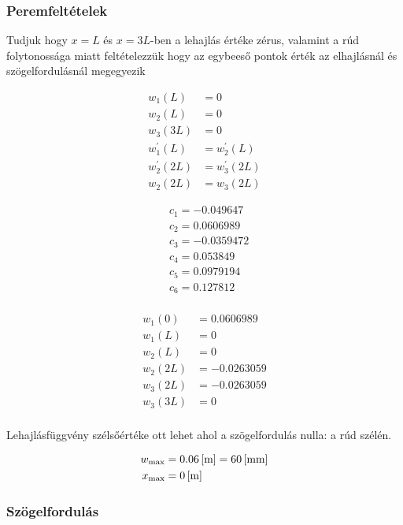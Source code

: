\newpage

\subsubsection{Peremfeltételek}

Tudjuk hogy $x = L$ és $x = 3L$-ben a lehajlás értéke zérus, valamint a rúd folytonossága miatt feltételezzük hogy az egybeeső pontok érték az elhajlásnál és szögelfordulásnál megegyezik

\begin{align*}
	w_1(L) &= 0 \\
	w_2(L) &= 0 \\
	w_3(3L) &= 0 \\
	w_1^{'}(L) &= w_2^{'}(L) \\
	w_2^{'}(2L) &= w_3^{'}(2L) \\
	w_2(2L) &= w_3(2L) 
\end{align*}

\begin{align*}
	&c_1 = -0.049647 \\
	&c_2 = 0.0606989 \\
	&c_3 = -0.0359472 \\
	&c_4 = 0.053849 \\
	&c_5 = 0.0979194 \\
	&c_6 = 0.127812 \\
\end{align*}

\begin{align*}
	w_1(0) &= 0.0606989 \\
	w_1(L) &= 0 \\
	w_2(L) &= 0 \\
	w_2(2L) &= -0.0263059 \\
	w_3(2L) &= -0.0263059 \\
	w_3(3L) &= 0 \\
\end{align*}

Lehajlásfüggvény szélsőértéke ott lehet ahol a szögelfordulás nulla: a rúd szélén.

\begin{align*}
	w_{\text{max}} &= \m{0.06} = \mm{60} \\
	x_{\text{max}} &= \m{0}
\end{align*}

\newpage

\subsubsection{Szögelfordulás}

